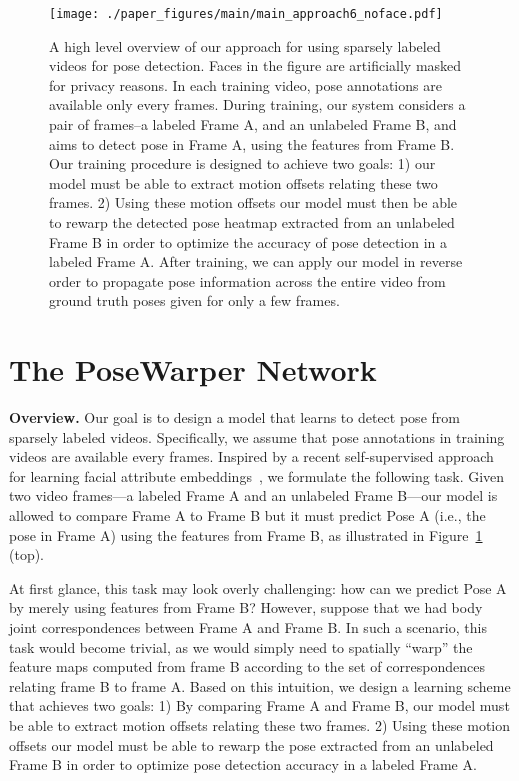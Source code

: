 \documentclass{article}
\begin{document}
\begin{figure}
\begin{center}
   \texttt{[image: ./paper\_figures/main/main\_approach6\_noface.pdf]}
\end{center}
\vspace{-0.1cm}
   \caption{A high level overview of our approach for using sparsely labeled videos for pose detection. Faces in the figure are artificially masked for privacy reasons. In each training video, pose annotations are available only every  frames. During training, our system considers a pair of frames--a labeled Frame A, and an unlabeled Frame B, and aims to detect pose in Frame A, using the features from Frame B.  Our training procedure is designed to achieve two goals: 1) our model must be able to extract motion offsets relating these two frames. 2) Using these motion offsets our model must then be able to rewarp the detected pose heatmap extracted from an unlabeled Frame B in order to optimize the accuracy of pose detection in a labeled Frame A. After training, we can apply our model in reverse order to propagate pose information across the entire video from ground truth poses given for only a few frames.\vspace{-0.5cm}} \label{main_fig}
\end{figure}


\section{The PoseWarper Network}


\textbf{Overview.} Our goal is to design a model that learns to detect pose from sparsely labeled videos. Specifically, we assume that pose annotations in training videos are available every  frames. Inspired by a recent self-supervised approach for learning facial attribute embeddings~\cite{Wiles18a}, we formulate the following task. Given two video frames---a labeled Frame A and an unlabeled Frame B---our model is allowed to compare Frame A to Frame B but it must predict Pose A (i.e., the pose in Frame A) using the features from Frame B, as illustrated in Figure~\ref{main_fig} (top).

At first glance, this task may look overly challenging: how can we predict Pose A by merely using features from Frame B? However, suppose that we had body joint correspondences between Frame A and Frame B. In such a scenario, this task would become trivial, as we would simply need to spatially ``warp'' the feature maps computed from frame B according to the set of correspondences relating frame B to frame A. Based on this intuition, we design a learning scheme that achieves two goals: 1) By comparing Frame A and Frame B, our model must be able to extract motion offsets relating these two frames. 2) Using these motion offsets our model  must be able to rewarp the pose extracted from an unlabeled Frame B in order to optimize pose detection accuracy in a labeled Frame A. 
\end{document}
